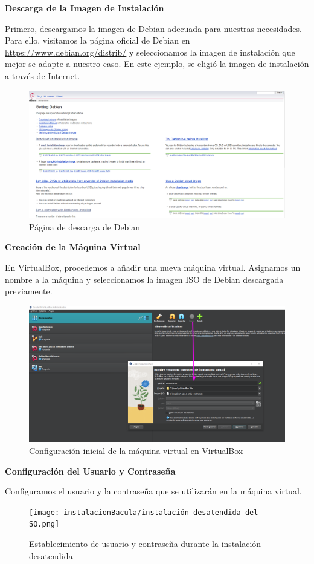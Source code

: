 
\textbf{Descarga de la Imagen de Instalación}
\medskip

Primero, descargamos la imagen de Debian adecuada para nuestras necesidades. Para ello, visitamos la página oficial de Debian en \url{https://www.debian.org/distrib/} y seleccionamos la imagen de instalación que mejor se adapte a nuestro caso. En este ejemplo, se eligió la imagen de instalación a través de Internet.

\begin{figure}[H]
    \centering
    \includegraphics[width=0.5\linewidth]{instalacionBacula/debianPaginaWeb.png}
    \caption{Página de descarga de Debian}
\end{figure}

\textbf{Creación de la Máquina Virtual}\medskip


En VirtualBox, procedemos a añadir una nueva máquina virtual. Asignamos un nombre a la máquina y seleccionamos la imagen ISO de Debian descargada previamente.

\begin{figure}[H]
    \centering
    \includegraphics[width=0.5\linewidth]{instalacionBacula/vbDebian.png}
    \caption{Configuración inicial de la máquina virtual en VirtualBox}
\end{figure}

\textbf{Configuración del Usuario y Contraseña}\medskip


Configuramos el usuario y la contraseña que se utilizarán en la máquina virtual.

\begin{figure}[H]
    \centering
    \texttt{[image: instalacionBacula/instalación desatendida del SO.png]}
    \caption{Establecimiento de usuario y contraseña durante la instalación desatendida}
\end{figure}

